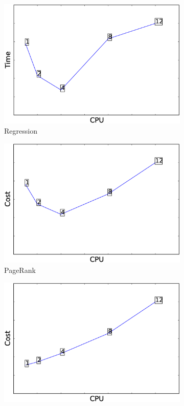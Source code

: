 \begin{figure}
\begin{subfigure}[b]{0.3\textwidth}
        \includegraphics[width=\textwidth]{Chapter-CAT/figures/regression_cpu_elapsed_12_1.eps}
        \caption{Regression}
        \label{fig:regression_time}
    \end{subfigure}
    \bigskip
    \begin{subfigure}[b]{0.3\textwidth}
        \includegraphics[width=\textwidth]{Chapter-CAT/figures/pagerank_cpu_cost_12_1.eps}
        \caption{PageRank}
        \label{fig:pagerank_cost}
    \end{subfigure}
    \begin{subfigure}[b]{0.3\textwidth}
        \includegraphics[width=\textwidth]{Chapter-CAT/figures/webloganalysis_cpu_cost_12_1.eps}

\end{subfigure}
\end{figure}
